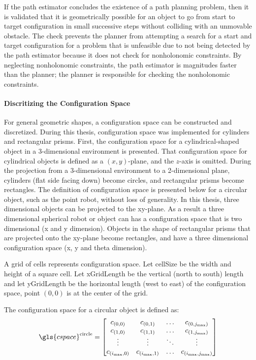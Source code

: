 If the path estimator concludes the existence of a path planning problem, then it is validated that it is geometrically possible for an object to go from start to target configuration in small successive steps without colliding with an unmovable obstacle. The check prevents the planner from attempting a search for a start and target configuration for a problem that is unfeasible due to not being detected by the path estimator because it does not check for nonholonomic constraints. By neglecting nonholonomic constraints, the path estimator is magnitudes faster than the planner; the planner is responsible for checking the nonholonomic constraints.

\paragraph{Discritizing the Configuration Space}
For general geometric shapes, a configuration space can be constructed and discretized. During this thesis, configuration space was implemented for cylinders and rectangular prisms. First, the configuration space for a cylindrical-shaped object in a 3-dimensional environment is presented. That configuration space for cylindrical objects is defined as a $(x, y)$-plane, and the $z$-axis is omitted. During the projection from a 3-dimensional environment to a 2-dimensional plane, cylinders (flat side facing down) become circles, and rectangular prisms become rectangles. The definition of configuration space is presented below for a circular object, such as the point robot, without loss of generality. In this thesis, three dimensional objects can be projected to the xy-plane. As a result a three dimensional spherical robot or object can has a configuration space that is two dimensional (\gls{x} and \gls{y} dimension). Objects in the shape of rectangular prisms that are projected onto the xy-plane become rectangles, and have a three dimensional configuration space (\gls{x}, \gls{y} and \gls{theta} dimension).\bs
\bs

A grid of cells represents configuration space. Let \gls{cellSize} be the width and height of a square cell. Let \gls{xGridLength} be the vertical (north to south) length and let \gls{yGridLength} be the horizontal length (west to east) of the configuration space, point $(0, 0)$ is at the center of the grid.\bs

The configuration space for a circular object is defined as:\bs
\[ \gls{cspace}^{\textrm{circle}} = 
\begin{bmatrix}
  c_{(0,0)} & c_{(0,1)} & \hdots & c_{(0,j_{\textrm{max}})}\\
  c_{(1,0)} & c_{(1,1)} & \hdots & c_{(1,j_{\textrm{max}})}\\
  \vdots &  \vdots & \ddots & \vdots\\
  c_{(i_{\textrm{max}},0)} & c_{(i_{\textrm{max}},1)} & \hdots & c_{(i_{\textrm{max}},j_{\textrm{max}})}\\
\end{bmatrix}
\]


